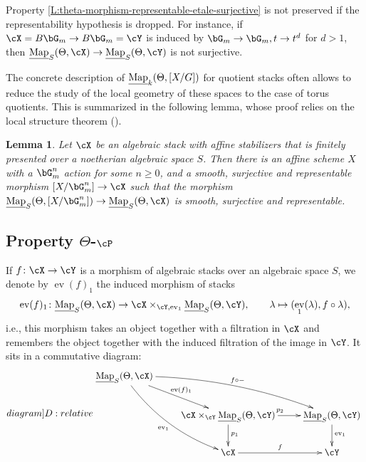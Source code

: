 \documentclass[a4paper]{amsart}
\numberwithin{equation}{section}
\theoremstyle{plain}
\newtheorem{lem}[thm]{Lemma}
\theoremstyle{definition}
\DeclareMathOperator{\ev}{ev}
\newcommand{\uMap}{\underline{{\rm Map}}}
\newcommand{\co}{\colon}
\begin{document}
Property \ref{L:theta-morphism-representable-etale-surjective} is not preserved if the representability hypothesis is dropped.  For instance, if $\cX = B\bG_m \to B\bG_m = \cY$ is induced by $\bG_m \to \bG_m, t \to t^d$ for $d > 1$, then $\uMap_S(\Theta,\cX) \to \uMap_S(\Theta,\cY)$ is not surjective. 

The concrete description of $\uMap_k(\Theta,[X/G])$ for quotient stacks often allows to reduce the study of the local geometry of these spaces to the case of torus quotients. This is summarized in the following lemma, whose proof relies on the local structure theorem ().

\begin{lem}{\cite[Lem.~4.4.6]{hlinstability}}  \label{L:filtration_atlas}
{Let $\cX$ be an algebraic stack with affine stabilizers that is finitely presented over a noetherian algebraic space $S$.} Then there is an affine scheme $X$ with a $\bG_m^n$ action for some $n\geq 0$, and a smooth, surjective and representable morphism $[X/\bG^n_m] \to \cX$ such that the morphism $\uMap_S(\Theta,[X/\bG^n_m]) \to \uMap_S(\Theta,\cX)$ is smooth, surjective and representable.
\end{lem}

\subsection{Property \texorpdfstring{$\Theta$-$\cP$}{Theta-P}} 
If $f \co \cX \to \cY$ is a morphism of algebraic stacks over an algebraic space $S$, we denote by $\ev(f)_1$ the induced morphism of stacks
$$
\ev(f)_1 \co \uMap_S(\Theta,\cX)  \to \cX \times_{\cY, \ev_1} \uMap_S(\Theta,\cY), \qquad \lambda \mapsto (\ev_1(\lambda), f \circ \lambda),
$$
i.e., this morphism takes an object together with a filtration in $\cX$ and remembers the object together with the induced filtration of the image in $\cY$.
It sits in a commutative diagram:
\begin{equation} 
\label[diagram]{D:relative}
\begin{split}
\xymatrix{
\uMap_S(\Theta,\cX)   \ar@/^1pc/[rrd]^-{f\circ -}  \ar@/_1pc/[rdd]_{\ev_1}  \ar[rd]^{\ev(f)_1}  \\
			& \cX \times_{\cY} \uMap_S(\Theta,\cY) \ar[r]^{p_2} \ar[d]^{p_1}		& \uMap_S(\Theta,\cY)  \ar[d]^{\ev_1}\\
			& \cX \ar[r]^f								& \cY
}
\end{split}
\end{equation}
\end{document}
